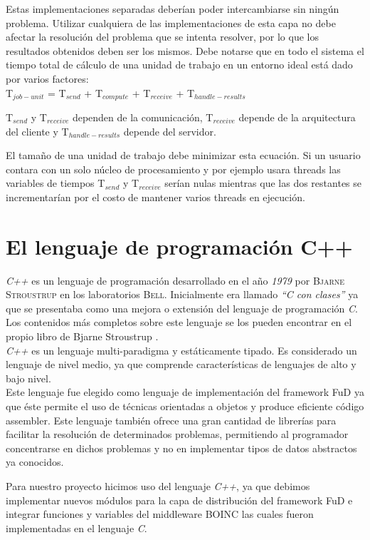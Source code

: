 Estas implementaciones separadas deberían poder intercambiarse sin ningún problema. Utilizar cualquiera de las implementaciones de esta capa no debe afectar la resolución del problema que se intenta resolver, por lo que los resultados obtenidos deben ser los mismos.
Debe notarse que en todo el sistema el tiempo total de cálculo de una unidad de trabajo en un entorno ideal está dado por varios factores:\\

T$_{job−unit}$ = T$_{send}$ + T$_{compute}$ + T$_{receive}$ + T$_{handle−results}$

\vspace{5mm}

T$_{send}$ y T$_{receive}$ dependen de la comunicación, T$_{receive}$ depende de la arquitectura del cliente y T$_{handle−results}$ depende del servidor. 

El tamaño de una unidad de trabajo debe minimizar esta ecuación. Si un usuario contara con un solo núcleo de procesamiento y por ejemplo
 usara threads las variables de tiempos T$_{send}$  y T$_{receive}$ serían nulas mientras que las dos restantes se incrementarían por el costo de mantener varios threads en ejecución.  


\section{El lenguaje de programación C++}

\textit{C++} es un lenguaje de programación desarrollado en el año \textit{1979} por \textsc{Bjarne Stroustrup} en los laboratorios \textsc{Bell}. 
Inicialmente era llamado \textit{“C con clases”} ya que se presentaba como una mejora o extensión del lenguaje de programación \textit{C}. 
Los contenidos más completos sobre este lenguaje se los pueden encontrar en el propio libro de Bjarne Stroustrup \cite{cplusplus}.\\

\textit{C++} es un lenguaje multi-paradigma y estáticamente tipado. Es considerado un lenguaje de nivel medio, ya que comprende características de lenguajes de alto y bajo nivel.\\

Este lenguaje fue elegido como lenguaje de implementación del framework FuD ya que éste permite el uso de técnicas orientadas a objetos y produce eficiente código assembler.
 Este lenguaje también ofrece una gran cantidad de librerías para facilitar la resolución de determinados problemas, permitiendo al programador concentrarse en dichos problemas
 y no en implementar tipos de datos abstractos ya conocidos.

Para nuestro proyecto hicimos uso del lenguaje \textit{C++}, ya que debimos implementar nuevos módulos para la capa de distribución del framework FuD e integrar
 funciones y variables del middleware BOINC las cuales fueron implementadas en el lenguaje \textit{C}.
